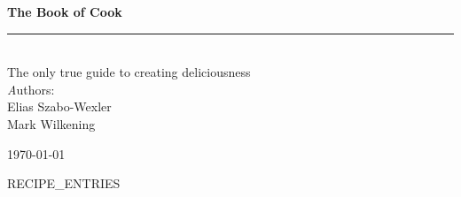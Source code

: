 \documentclass[
a4paper,
11pt
]{article}
\begin{document}
\begin{titlepage}
  \begin{center}
    \vspace*{3cm}
    {\Huge \bf The Book of Cook} \\[0.5cm]

    \rule{\linewidth}{0.5mm} \\[0.5cm]

    {\Huge The only true guide to creating deliciousness}
    \\[1.5cm]

    {\emph Authors:} \\[0.5cm]
    Elias Szabo-Wexler \\
    Mark Wilkening \\

    \vfill

    {\large \today}
  \end{center}
\end{titlepage}

\tableofcontents
\newpage

{{RECIPE_ENTRIES}}
\end{document}
